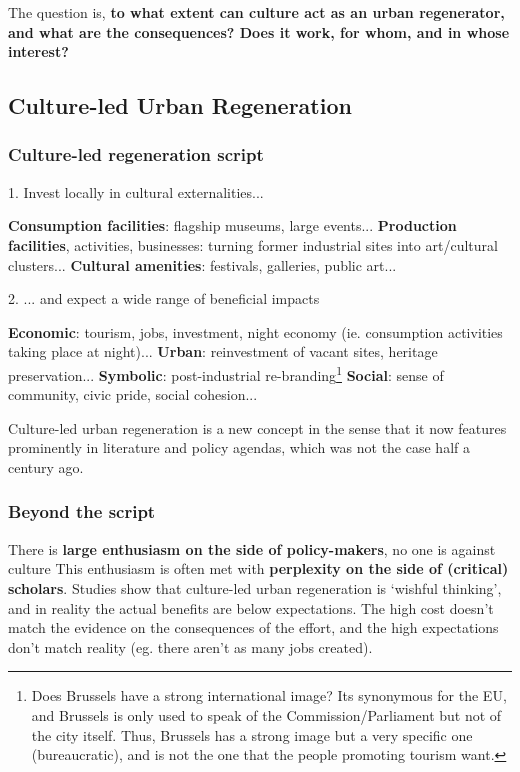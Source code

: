 \documentclass{article}
\begin{document}
The question is, \textbf{to what extent can culture act as an urban regenerator, and what are the consequences? Does it work, for whom, and in whose interest?}

\subsection{Culture-led Urban Regeneration}

\subsubsection{Culture-led regeneration script}

1. Invest locally in cultural externalities...

\begin{outline}
	\1 \textbf{Consumption facilities}: flagship museums, large events...
	\1 \textbf{Production facilities}, activities, businesses: turning former industrial sites into art/cultural clusters...
	\1 \textbf{Cultural amenities}: festivals, galleries, public art...
\end{outline}

2. ... and expect a wide range of beneficial impacts

\begin{outline}
	\1 \textbf{Economic}: tourism, jobs, investment, night economy (ie. consumption activities taking place at night)...
	\1 \textbf{Urban}: reinvestment of vacant sites, heritage preservation...
	\1 \textbf{Symbolic}: post-industrial re-branding\footnote{Does Brussels have a strong international image? Its synonymous for the EU, and Brussels is only used to speak of the Commission/Parliament but not of the city itself. Thus, Brussels has a strong image but a very specific one (bureaucratic), and is not the one that the people promoting tourism want.}
	\1 \textbf{Social}: sense of community, civic pride, social cohesion...
\end{outline}

Culture-led urban regeneration is a new concept in the sense that it now features prominently in literature and policy agendas, which was not the case half a century ago. 

\subsubsection{Beyond the script}

There is \textbf{large enthusiasm on the side of policy-makers}, no one is against culture
This enthusiasm is often met with \textbf{perplexity on the side of (critical) scholars}. Studies show that culture-led urban regeneration is `wishful thinking', and in reality the actual benefits are below expectations. The high cost doesn't match the evidence on the consequences of the effort, and the high expectations don't match reality (eg. there aren't as many jobs created).
\end{document}
